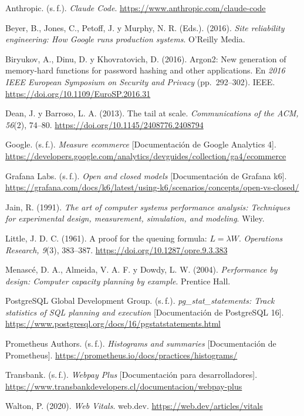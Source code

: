 \documentclass[11pt,a4paper]{article}
\begin{document}
\begin{list}{}{\setlength{\leftmargin}{1.5em}\setlength{\itemindent}{-1.5em}
  \setlength{\itemsep}{4pt}\small}
\item Anthropic. (s.\,f.). \emph{Claude Code}. \url{https://www.anthropic.com/claude-code}
\item Beyer, B., Jones, C., Petoff, J. y Murphy, N. R. (Eds.). (2016).
  \emph{Site reliability engineering: How Google runs production systems}. O'Reilly Media.
\item Biryukov, A., Dinu, D. y Khovratovich, D. (2016). Argon2: New generation of
  memory-hard functions for password hashing and other applications. En
  \emph{2016 IEEE European Symposium on Security and Privacy} (pp.~292--302). IEEE.
  \url{https://doi.org/10.1109/EuroSP.2016.31}
\item Dean, J. y Barroso, L. A. (2013). The tail at scale. \emph{Communications
  of the ACM, 56}(2), 74--80. \url{https://doi.org/10.1145/2408776.2408794}
\item Google. (s.\,f.). \emph{Measure ecommerce} [Documentación de Google
  Analytics 4]. \url{https://developers.google.com/analytics/devguides/collection/ga4/ecommerce}
\item Grafana Labs. (s.\,f.). \emph{Open and closed models} [Documentación de
  Grafana k6]. \url{https://grafana.com/docs/k6/latest/using-k6/scenarios/concepts/open-vs-closed/}
\item Jain, R. (1991). \emph{The art of computer systems performance analysis:
  Techniques for experimental design, measurement, simulation, and modeling}. Wiley.
\item Little, J. D. C. (1961). A proof for the queuing formula: $L = \lambda W$.
  \emph{Operations Research, 9}(3), 383--387. \url{https://doi.org/10.1287/opre.9.3.383}
\item Menascé, D. A., Almeida, V. A. F. y Dowdy, L. W. (2004). \emph{Performance
  by design: Computer capacity planning by example}. Prentice Hall.
\item PostgreSQL Global Development Group. (s.\,f.). \emph{pg\_stat\_statements:
  Track statistics of SQL planning and execution} [Documentación de PostgreSQL 16].
  \url{https://www.postgresql.org/docs/16/pgstatstatements.html}
\item Prometheus Authors. (s.\,f.). \emph{Histograms and summaries}
  [Documentación de Prometheus]. \url{https://prometheus.io/docs/practices/histograms/}
\item Transbank. (s.\,f.). \emph{Webpay Plus} [Documentación para
  desarrolladores]. \url{https://www.transbankdevelopers.cl/documentacion/webpay-plus}
\item Walton, P. (2020). \emph{Web Vitals}. web.dev.
  \url{https://web.dev/articles/vitals}
\end{list}
\end{document}
